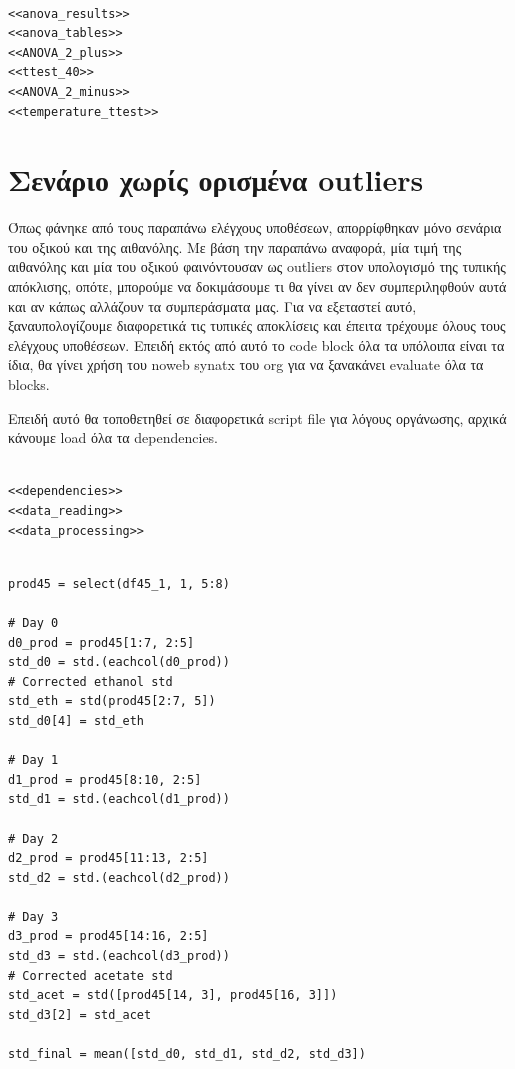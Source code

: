 \documentclass[11pt]{article}
\begin{document}
\begin{verbatim}

<<anova_results>>
<<anova_tables>>
<<ANOVA_2_plus>>
<<ttest_40>>
<<ANOVA_2_minus>>
<<temperature_ttest>>

\end{verbatim}

\section{Σενάριο χωρίς ορισμένα outliers}
\label{sec:orgd4b32a0}
Όπως φάνηκε από τους παραπάνω ελέγχους υποθέσεων, απορρίφθηκαν μόνο σενάρια του οξικού και της αιθανόλης. Με βάση την παραπάνω αναφορά, μία τιμή της αιθανόλης και μία του οξικού φαινόντουσαν ως outliers στον υπολογισμό της τυπικής απόκλισης, οπότε, μπορούμε να δοκιμάσουμε τι θα γίνει αν δεν συμπεριληφθούν αυτά και αν κάπως αλλάζουν τα συμπεράσματα μας. Για να εξεταστεί αυτό, ξαναυπολογίζουμε διαφορετικά τις τυπικές αποκλίσεις και έπειτα τρέχουμε όλους τους ελέγχους υποθέσεων. Επειδή εκτός από αυτό το code block όλα τα υπόλοιπα είναι τα ίδια, θα γίνει χρήση του noweb synatx του org για να ξανακάνει evaluate όλα τα blocks.

Επειδή αυτό θα τοποθετηθεί σε διαφορετικά script file για λόγους οργάνωσης, αρχικά κάνουμε load όλα τα dependencies.

\begin{verbatim}

<<dependencies>>
<<data_reading>>
<<data_processing>>

\end{verbatim}

\begin{verbatim}

prod45 = select(df45_1, 1, 5:8)

# Day 0
d0_prod = prod45[1:7, 2:5]
std_d0 = std.(eachcol(d0_prod))
# Corrected ethanol std
std_eth = std(prod45[2:7, 5])
std_d0[4] = std_eth

# Day 1
d1_prod = prod45[8:10, 2:5]
std_d1 = std.(eachcol(d1_prod))

# Day 2
d2_prod = prod45[11:13, 2:5]
std_d2 = std.(eachcol(d2_prod))

# Day 3
d3_prod = prod45[14:16, 2:5]
std_d3 = std.(eachcol(d3_prod))
# Corrected acetate std
std_acet = std([prod45[14, 3], prod45[16, 3]])
std_d3[2] = std_acet

std_final = mean([std_d0, std_d1, std_d2, std_d3])
\end{verbatim}
\end{document}
